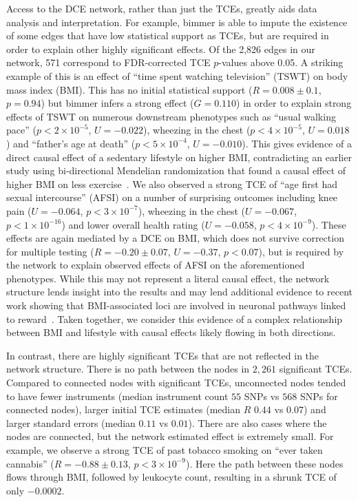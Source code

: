 \documentclass{article}
\begin{document}
Access to the DCE network, rather than just the TCEs, greatly aids data analysis and interpretation.
For example, bimmer is able to impute the existence of some edges that have low statistical
support as TCEs, but are required in order to explain other highly significant effects. Of the
2,826 edges in our network, 571 correspond to FDR-corrected TCE $p$-values above 0.05. A striking
example of this is an effect of ``time spent watching television'' (TSWT) on body mass index (BMI).
This has no initial statistical support ($R = 0.008 \pm 0.1$, $p = 0.94$) but bimmer
infers a strong effect ($G = 0.110$) in order to explain strong effects of TSWT on numerous downstream
phenotypes such as ``usual walking pace'' ($p < 2 \times 10^{-5}$, $U = -0.022$),  wheezing in the chest
($p < 4\times 10^{-5}$, $U = 0.018$) and ``father's age at death'' ($p < 5\times 10^{-4}$, $U = -0.010$).
This gives evidence of a direct causal effect of a sedentary lifestyle on higher BMI, contradicting
an earlier study using bi-directional Mendelian randomization that found a causal effect of
higher BMI on less exercise~\cite{Richmond2014}.
We also observed a strong TCE of ``age first had sexual intercourse'' (AFSI) on a number
of surprising outcomes including knee pain ($U = -0.064$, $p < 3 \times 10^{-7}$),
wheezing in the chest ($U = -0.067$, $p < 1 \times 10^{-16}$) and
lower overall health rating ($U = -0.058$, $p < 4 \times 10^{-9}$). These effects are again
mediated by a DCE on BMI, which does not survive
correction for multiple testing ($R = -0.20 \pm 0.07$, $U = -0.37$, $p < 0.07$),
but is required by the network to explain observed effects of AFSI on the aforementioned phenotypes.
While this may not represent a literal causal effect, the network structure lends
insight into the results and may lend additional evidence to recent work
showing that BMI-associated loci are involved
in neuronal pathways linked to reward~\cite{Ndiaye2020}. Taken together, we consider
this evidence of a complex relationship between BMI and lifestyle with causal effects
likely flowing in both directions.


In contrast, there are highly significant TCEs that are not reflected in
the network structure. There is no path between the nodes in $2,261$ significant TCEs.
Compared to connected nodes with significant TCEs, unconnected nodes tended to have fewer instruments
(median instrument count $55$ SNPs vs $568$ SNPs for connected nodes), larger initial
TCE estimates (median $R$ $0.44$ vs $0.07$) and larger standard errors
(median $0.11$ vs $0.01$). There are also cases where the nodes are connected, but the network
estimated effect is extremely small.
For example, we observe a strong TCE of 
past tobacco smoking on ``ever taken cannabis'' ($R = -0.88 \pm 0.13$, $p < 3 \times 10^{-9}$).
Here the path between these nodes flows through BMI, followed by leukocyte count,
resulting in a shrunk TCE of only $-0.0002$.
 
\end{document}
